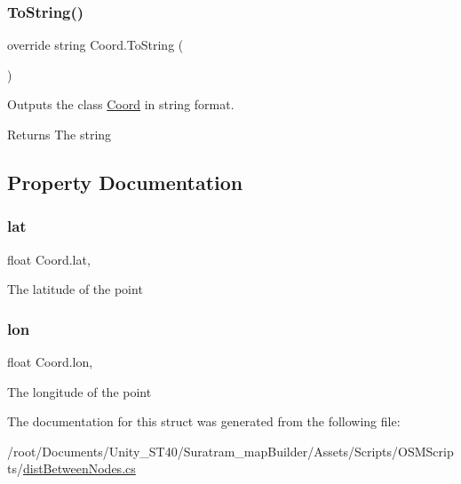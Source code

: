 \subsubsection{\texorpdfstring{To\+String()}{ToString()}}
{\footnotesize\ttfamily override string Coord.\+To\+String (\begin{DoxyParamCaption}{ }\end{DoxyParamCaption})}



Outputs the class \hyperlink{structCoord}{Coord} in string format. 

\begin{DoxyReturn}{Returns}
The string
\end{DoxyReturn}


\subsection{Property Documentation}
\mbox{\label{structCoord_adee2cdba9052e04aa6056c8e05900736}} 
\subsubsection{\texorpdfstring{lat}{lat}}
{\footnotesize\ttfamily float Coord.\+lat\hspace{0.3cm}{\ttfamily [get]}, {\ttfamily [set]}}



The latitude of the point

\mbox{\label{structCoord_a11d9174715f32a5728e029fc4a32aaa2}} 
\subsubsection{\texorpdfstring{lon}{lon}}
{\footnotesize\ttfamily float Coord.\+lon\hspace{0.3cm}{\ttfamily [get]}, {\ttfamily [set]}}



The longitude of the point



The documentation for this struct was generated from the following file\+:\begin{DoxyCompactItemize}
\item 
/root/\+Documents/\+Unity\+\_\+\+S\+T40/\+Suratram\+\_\+map\+Builder/\+Assets/\+Scripts/\+O\+S\+M\+Scripts/\hyperlink{distBetweenNodes_8cs}{dist\+Between\+Nodes.\+cs}\end{DoxyCompactItemize}

